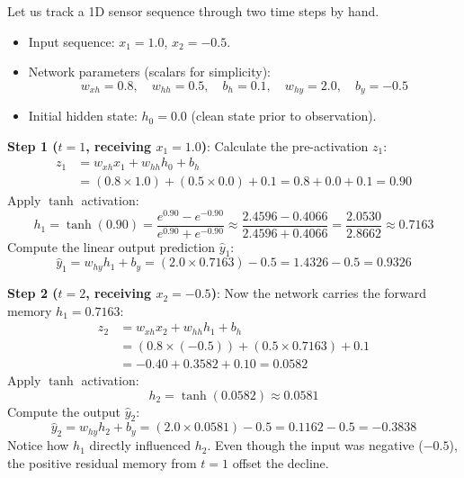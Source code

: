 \begin{example}
Let us track a 1D sensor sequence through two time steps by hand.
\begin{itemize}
    \item Input sequence: $x_1 = 1.0$, $x_2 = -0.5$.
    \item Network parameters (scalars for simplicity):
    \begin{equation*}
    w_{xh} = 0.8, \quad w_{hh} = 0.5, \quad b_h = 0.1, \quad w_{hy} = 2.0, \quad b_y = -0.5
    \end{equation*}
    \item Initial hidden state: $h_0 = 0.0$ (clean state prior to observation).
\end{itemize}

\textbf{Step 1 ($t = 1$, receiving $x_1 = 1.0$)}:
Calculate the pre-activation $z_1$:
\begin{align*}
z_1 &= w_{xh} x_1 + w_{hh} h_0 + b_h \\
    &= (0.8 \times 1.0) + (0.5 \times 0.0) + 0.1 = 0.8 + 0.0 + 0.1 = 0.90
\end{align*}
Apply $\tanh$ activation:
\begin{equation*}
h_1 = \tanh(0.90) = \frac{e^{0.90} - e^{-0.90}}{e^{0.90} + e^{-0.90}} \approx \frac{2.4596 - 0.4066}{2.4596 + 0.4066} = \frac{2.0530}{2.8662} \approx \mathbf{0.7163}
\end{equation*}
Compute the linear output prediction $\hat{y}_1$:
\begin{equation*}
\hat{y}_1 = w_{hy} h_1 + b_y = (2.0 \times 0.7163) - 0.5 = 1.4326 - 0.5 = \mathbf{0.9326}
\end{equation*}

\textbf{Step 2 ($t = 2$, receiving $x_2 = -0.5$)}:
Now the network carries the forward memory $h_1 = 0.7163$:
\begin{align*}
z_2 &= w_{xh} x_2 + w_{hh} h_1 + b_h \\
    &= (0.8 \times (-0.5)) + (0.5 \times 0.7163) + 0.1 \\
    &= -0.40 + 0.3582 + 0.10 = \mathbf{0.0582}
\end{align*}
Apply $\tanh$ activation:
\begin{equation*}
h_2 = \tanh(0.0582) \approx \mathbf{0.0581}
\end{equation*}
Compute the output $\hat{y}_2$:
\begin{equation*}
\hat{y}_2 = w_{hy} h_2 + b_y = (2.0 \times 0.0581) - 0.5 = 0.1162 - 0.5 = \mathbf{-0.3838}
\end{equation*}
Notice how $h_1$ directly influenced $h_2$. Even though the input was negative ($-0.5$), the positive residual memory from $t=1$ offset the decline.
\end{example}

